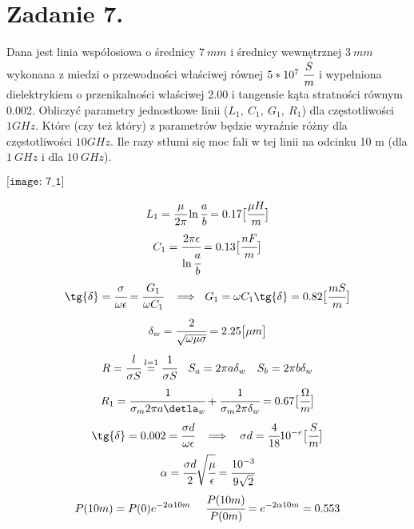 \section*{Zadanie 7.}
\begin{task}
Dana jest linia współosiowa o średnicy $7\ mm$ i średnicy wewnętrznej $3\ mm$ wykonana z miedzi o przewodności właściwej równej $5*10^{7}\ \cfrac{S}{m}$ i wypełniona dielektrykiem o przenikalności właściwej 2.00 i tangensie kąta stratności równym 0.002. Obliczyć parametry jednostkowe linii ($L_{1},\ C_{1},\ G_{1},\ R_{1}$) dla częstotliwości $1GHz$. Które (czy też który) z parametrów będzie wyraźnie różny dla częstotliwości $10GHz$. Ile razy stłumi się moc fali w tej linii na odcinku 10 m (dla $1\ GHz$ i dla $10\ GHz$).\\
\end{task}

\begin{solution}
\begin{center}
$\texttt{[image: 7\_1]}$\\
\end{center}

$$L_{1}=\cfrac{\mu}{2\pi}\ln{\cfrac{a}{b}}=0.17\big{[}\cfrac{\mu H}{m}\big{]}$$
$$C_{1}=\cfrac{2\pi\epsilon}{\ln{\cfrac{a}{b}}}=0.13\big{[}\cfrac{nF}{m}\big{]}$$
$$\tg{\delta}=\cfrac{\sigma}{\omega\epsilon}=\cfrac{G_{1}}{\omega C_{1}} \ \ \implies \ G_{1}=\omega C_{1}\tg{\delta} = 0.82\big{[}\cfrac{mS}{m}\big{]}$$
$$\delta_{w}=\cfrac{2}{\sqrt{\omega\mu\sigma}}=2.25 \big{[}\mu m\big{]}$$
$$R=\cfrac{l}{\sigma S}\stackrel{l=1}{=}\cfrac{1}{\sigma S}\ \ \ S_{a}=2\pi a\delta_{w}\ \ \ S_{b}=2\pi b\delta_{w}$$
$$R_{1}=\cfrac{1}{ \sigma_{m}2 \pi a \detla_{w}}+\cfrac{1}{ \sigma_{m} 2 \pi \delta_{w}}=0.67 \big{[} \cfrac{\Omega}{m} \big{]}$$
$$\tg{\delta}=0.002=\cfrac{\sigma d}{\omega\epsilon}\ \ \implies \ \ \sigma d=\cfrac{4}{18}10^{-e}\big{[}\cfrac{S}{m}\big{]}$$
$$\alpha=\cfrac{\sigma d}{2}\sqrt{\cfrac{\mu}{\epsilon}}=\cfrac{10^{-3}}{9\sqrt{2}}$$
$$P(10m)=P(0)e^{-2\alpha 10m}\ \ \ \ \cfrac{P(10m)}{P(0m)}=e^{-2\alpha 10m}=0.553$$
\end{solution}
